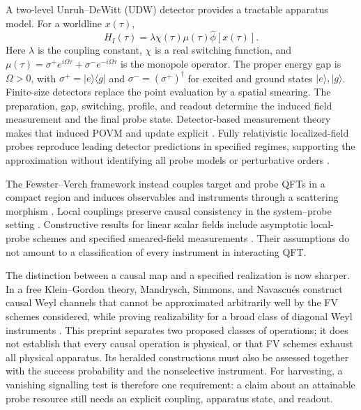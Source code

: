 \documentclass[pdflatex,sn-mathphys-num]{sn-jnl}
\begin{document}
A two-level Unruh--DeWitt (UDW) detector provides a tractable apparatus model. For a worldline $x(\tau)$,
\begin{equation}
H_I(\tau)=\lambda\chi(\tau)\mu(\tau)\hat\phi[x(\tau)].
\label{eq:udw}
\end{equation}
Here $\lambda$ is the coupling constant, $\chi$ is a real switching function, and $\mu(\tau)=\sigma^+e^{i\Omega\tau}+\sigma^-e^{-i\Omega\tau}$ is the monopole operator. The proper energy gap is $\Omega>0$, with $\sigma^+=|e\rangle\langle g|$ and $\sigma^-=(\sigma^+)^\dagger$ for excited and ground states $|e\rangle,|g\rangle$.
Finite-size detectors replace the point evaluation by a spatial smearing. The preparation, gap, switching, profile, and readout determine the induced field measurement and the final probe state. Detector-based measurement theory makes that induced POVM and update explicit \cite{PoloGomez2022}. Fully relativistic localized-field probes reproduce leading detector predictions in specified regimes, supporting the approximation without identifying all probe models or perturbative orders \cite{GrimmerTorresMartinez2021,PercheLocalizedQFT2024,Perche2024}.

The Fewster--Verch framework instead couples target and probe QFTs in a compact region and induces observables and instruments through a scattering morphism \cite{FewsterVerch2020}. Local couplings preserve causal consistency in the system--probe setting \cite{BostelmannFewsterRuep2021}. Constructive results for linear scalar fields include asymptotic local-probe schemes and specified smeared-field measurements \cite{FewsterJubbRuep2023,MandryschNavascues2025}. Their assumptions do not amount to a classification of every instrument in interacting QFT.

The distinction between a causal map and a specified realization is now sharper. In a free Klein--Gordon theory, Mandrysch, Simmons, and Navascu\'es construct causal Weyl channels that cannot be approximated arbitrarily well by the FV schemes considered, while proving realizability for a broad class of diagonal Weyl instruments \cite{MandryschSimmonsNavascues2026}. This preprint separates two proposed classes of operations; it does not establish that every causal operation is physical, or that FV schemes exhaust all physical apparatus. Its heralded constructions must also be assessed together with the success probability and the nonselective instrument. For harvesting, a vanishing signalling test is therefore one requirement: a claim about an attainable probe resource still needs an explicit coupling, apparatus state, and readout.
\end{document}
